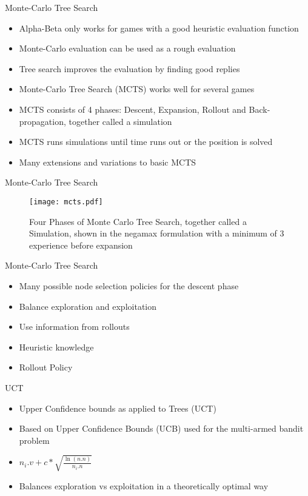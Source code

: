 \documentclass{beamer} %
\begin{document}
\begin{frame}{Monte-Carlo Tree Search}
\begin{itemize}
	\item Alpha-Beta only works for games with a good heuristic evaluation function
	\item Monte-Carlo evaluation can be used as a rough evaluation
	\item Tree search improves the evaluation by finding good replies
	\item Monte-Carlo Tree Search (MCTS) works well for several games
	\item MCTS consists of 4 phases: Descent, Expansion, Rollout and Back-propagation, together called a simulation
	\item MCTS runs simulations until time runs out or the position is solved
	\item Many extensions and variations to basic MCTS
\end{itemize}
\end{frame}


\begin{frame}{Monte-Carlo Tree Search}
\begin{figure}
	\centering
\texttt{[image: mcts.pdf]}
\caption[Four Phases of Monte Carlo Tree Search]{Four Phases of Monte Carlo Tree Search, together called a Simulation, shown in the negamax formulation with a minimum of 3 experience before expansion}
\label{fig:mcts}
\end{figure}
\end{frame}

\begin{frame}{Monte-Carlo Tree Search}
\begin{itemize}
	\item Many possible node selection policies for the descent phase
	\item Balance exploration and exploitation
	\item Use information from rollouts
	\item Heuristic knowledge
	\item Rollout Policy
\end{itemize}
\end{frame}


\begin{frame}{UCT}
\begin{itemize}
	\item Upper Confidence bounds as applied to Trees (UCT)
	\item Based on Upper Confidence Bounds (UCB) used for the multi-armed bandit problem
	\item $ n_i.v + c*\sqrt{\frac{\ln(n.n)}{n_i.n}} $
	\item Balances exploration vs exploitation in a theoretically optimal way
\end{itemize}
\end{frame}
\end{document}
